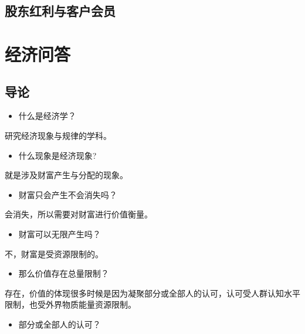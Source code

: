 \documentclass[
  letterpaper,
  DIV=11,
  numbers=noendperiod]{scrreprt}
\providecommand{\tightlist}{%
  \setlength{\itemsep}{0pt}\setlength{\parskip}{0pt}}\usepackage{longtable,booktabs,array}
\begin{document}
\subsection{股东红利与客户会员}\label{ux80a1ux4e1cux7ea2ux5229ux4e0eux5ba2ux6237ux4f1aux5458}

\section{经济问答}\label{ux7ecfux6d4eux95eeux7b54}

\subsection{导论}\label{ux5bfcux8bba}

\begin{itemize}
\tightlist
\item
  什么是经济学？
\end{itemize}

研究经济现象与规律的学科。

\begin{itemize}
\tightlist
\item
  什么现象是经济现象?
\end{itemize}

就是涉及财富产生与分配的现象。

\begin{itemize}
\tightlist
\item
  财富只会产生不会消失吗？
\end{itemize}

会消失，所以需要对财富进行价值衡量。

\begin{itemize}
\tightlist
\item
  财富可以无限产生吗？
\end{itemize}

不，财富是受资源限制的。

\begin{itemize}
\tightlist
\item
  那么价值存在总量限制？
\end{itemize}

存在，价值的体现很多时候是因为凝聚部分或全部人的认可，认可受人群认知水平限制，也受外界物质能量资源限制。

\begin{itemize}
\tightlist
\item
  部分或全部人的认可？
\end{itemize}
\end{document}

